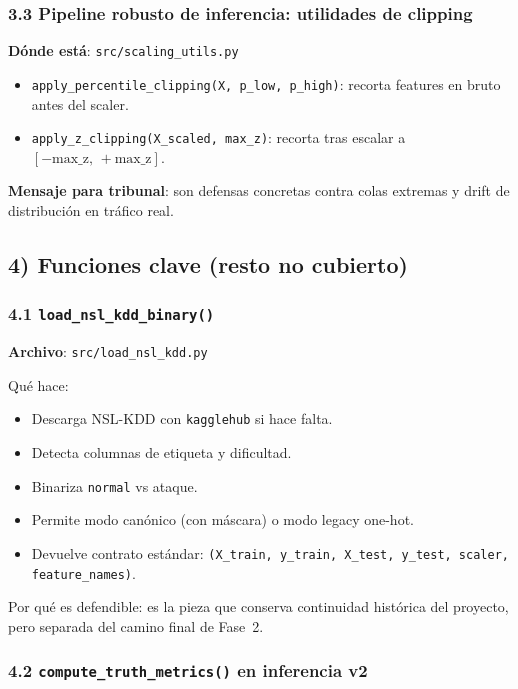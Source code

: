 ﻿\documentclass[12pt,a4paper]{article}
\begin{document}
\subsubsection{3.3 Pipeline robusto de inferencia: utilidades de clipping}

\textbf{Dónde está}: \verb|src/scaling_utils.py|

\begin{itemize}
  \item \verb|apply_percentile_clipping(X, p_low, p_high)|: recorta features en bruto antes del
        scaler.
  \item \verb|apply_z_clipping(X_scaled, max_z)|: recorta tras escalar a
        \([-\text{max\_z},\, +\text{max\_z}]\).
\end{itemize}

\textbf{Mensaje para tribunal}: son defensas concretas contra colas extremas y drift de distribución
en tráfico real.

\subsection{4) Funciones clave (resto no cubierto)}

\subsubsection{4.1 \texttt{load\_nsl\_kdd\_binary()}}

\textbf{Archivo}: \verb|src/load_nsl_kdd.py|

Qué hace:

\begin{itemize}
  \item Descarga NSL-KDD con \texttt{kagglehub} si hace falta.
  \item Detecta columnas de etiqueta y dificultad.
  \item Binariza \texttt{normal} vs ataque.
  \item Permite modo canónico (con máscara) o modo legacy one-hot.
  \item Devuelve contrato estándar:
        \texttt{(X\_train, y\_train, X\_test, y\_test, scaler, feature\_names)}.
\end{itemize}

Por qué es defendible: es la pieza que conserva continuidad histórica del proyecto, pero separada
del camino final de Fase~2.

\subsubsection{4.2 \texttt{compute\_truth\_metrics()} en inferencia v2}
\end{document}
